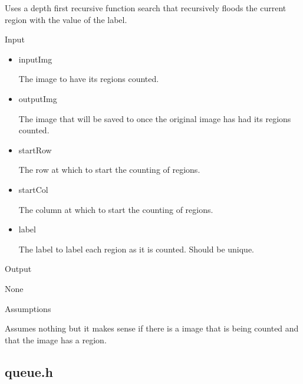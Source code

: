 \documentclass[pdftex, 11pt]{article}
\begin{document}
\begin{description}
\begin{description}
				Uses a depth first recursive function search
				that recursively floods the current region with
				the value of the label.

			\item{Input}

				\begin{itemize}

					\item{inputImg}

						The image to have its regions
						counted.

					\item{outputImg}

						The image that will be saved to
						once the original image has had
						its regions counted.

					\item{startRow}

						The row at which to start the
						counting of regions.

					\item{startCol}

						The column at which to start the
						counting of regions.

					\item{label}

						The label to label each region
						as it is counted. Should be
						unique.
				

				\end{itemize}

			\item{Output}

				None

			\item{Assumptions}

				Assumes nothing but it makes sense if there is a
				image that is being counted and that the image
				has a region.


		\end{description}



\end{description}

\subsection{queue.h}
\end{document}
